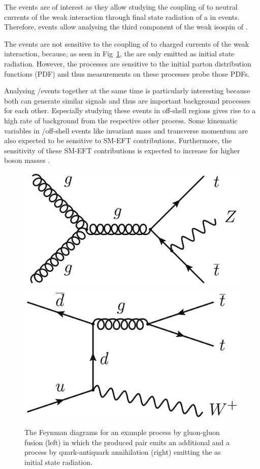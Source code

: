 \documentclass[bachelor,oneside, BCOR10mm,
			ngerman,english  %
]{GAUBM}
\begin{document}
The \ttbarZ events are of interest as they allow studying the coupling of \tquarks to neutral currents of the weak interaction through final state radiation of a \zboson in \ttbar events. Therefore, \ttbarZ events allow analysing the third component of the weak isospin of \tquarks.

The \ttbarW events are not sensitive to the coupling of \tquarks to charged currents of the weak interaction, because, as seen in Fig~\ref{fig:production_ttz_ttw}, the \wbosons are only emitted as initial state radiation. However, the \ttbarW processes are sensitive to the initial parton distribution functions (PDF) and thus measurements on these processes probe those PDFs.

Analysing \ttbarZ/\ttbarW events together at the same time is particularly interesting because both can generate similar signals and thus are important background processes for each other. Especially studying these events in off-shell regions gives rise to a high rate of background from the respective other process. Some kinematic variables in \ttbarZ/\ttbarW off-shell events like invariant mass and transverse momentum   are also expected to be sensitive to SM-EFT contributions. Furthermore, the sensitivity of these SM-EFT contributions is expected to increase for higher boson masses \cite{sm_eft_top}.

\begin{figure}[t]
	\centering
	\includegraphics[width=.4\textwidth]{figures/theory/ttZ_feynman.png}\hspace{.1\textwidth}
	\includegraphics[width=.4\textwidth]{figures/theory/ttW_feynman.png}
	\caption{The Feynman diagrams for an example \ttbarZ process by gluon-gluon fusion (left) in which the produced \ttbar pair emits an additional \zboson and a \ttbarW process by quark-antiquark annihilation (right) emitting the \wboson as initial state radiation.}
	\label{fig:production_ttz_ttw}
\end{figure}
\end{document}
